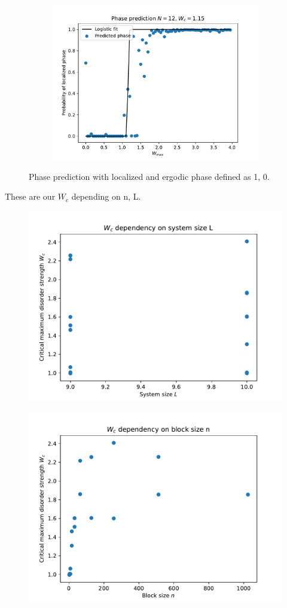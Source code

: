 \documentclass[reprint,amsmath,amssymb,aps,prb]{revtex4-2}
\begin{document}
\begin{figure}[H]
\begin{subfigure}[c]{0.3\textwidth}
		\includegraphics[width=\textwidth]{../results/N12_predict_wc}
		\label{fig:N12_predict_wc}
	\end{subfigure}
	\caption{Phase prediction with localized and ergodic phase defined as 1, 0.}
\end{figure}


These are our $W_c$ depending on n, L.


\begin{figure}
	\centering
	\includegraphics[width=0.7\linewidth]{../results/Wc_L_dependency}
	\caption{}
	\label{fig:Wc_L_dependency}
\end{figure}
\begin{figure}
\centering
\includegraphics[width=0.7\linewidth]{../results/Wc_N_dependency}
\caption{}
\label{fig:Wc_N_dependency}
\end{figure}
\end{document}
